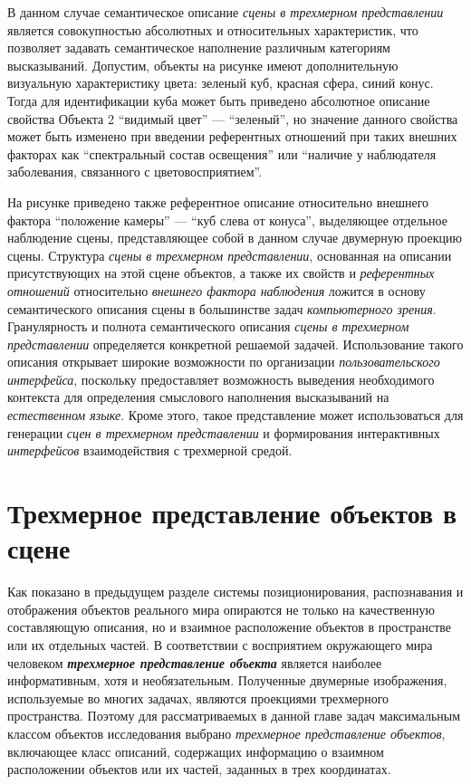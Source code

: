 В данном случае семантическое описание \textit{сцены в трехмерном представлении} является совокупностью абсолютных и относительных характеристик, что позволяет задавать семантическое наполнение различным категориям высказываний. Допустим, объекты на рисунке имеют дополнительную визуальную характеристику цвета: зеленый куб, красная сфера, синий конус. Тогда для идентификации куба может быть приведено абсолютное описание свойства Объекта 2 ``видимый цвет'' --- ``зеленый'', но значение данного свойства может быть изменено при введении референтных отношений при таких внешних факторах как ``спектральный состав освещения'' или ``наличие у наблюдателя заболевания, связанного с цветовосприятием''. 

На рисунке приведено также референтное описание относительно внешнего фактора ``положение камеры'' --- ``куб слева от конуса'', выделяющее отдельное наблюдение сцены, представляющее собой в данном случае двумерную проекцию сцены. Структура \textit{сцены в трехмерном представлении}, основанная на описании присутствующих на этой сцене объектов, а также их свойств и \textit{референтных отношений} относительно \textit{внешнего фактора наблюдения} ложится в основу семантического описания сцены в большинстве задач \textit{компьютерного зрения}. Гранулярность и полнота семантического описания \textit{сцены в трехмерном представлении} определяется конкретной решаемой задачей. Использование такого описания открывает широкие возможности по организации \textit{пользовательского интерфейса}, поскольку предоставляет возможность выведения необходимого контекста для определения смыслового наполнения высказываний на \textit{естественном языке}. Кроме этого, такое представление может использоваться для генерации \textit{сцен в трехмерном представлении} и формирования интерактивных \textit{интерфейсов} взаимодействия с трехмерной средой.


\section{Трехмерное представление объектов в сцене}
\label{sec_3d_models_representation}

Как показано в предыдущем разделе системы позиционирования, распознавания и отображения объектов реального мира опираются не только на качественную составляющую описания, но и взаимное расположение объектов в пространстве или их отдельных частей. В соответствии с восприятием окружающего мира человеком \textbf{\textit{трехмерное представление объекта}} является наиболее информативным, хотя и необязательным. Полученные двумерные изображения, используемые во многих задачах, являются проекциями трехмерного пространства. Поэтому для рассматриваемых в данной главе задач максимальным классом объектов исследования выбрано \textit{трехмерное представление объектов}, включающее класс описаний, содержащих информацию о взаимном расположении объектов или их частей, заданных в трех координатах.

